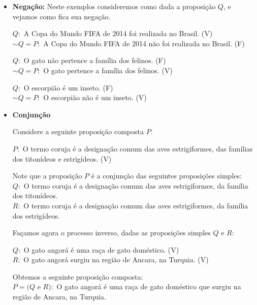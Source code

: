  \begin{itemize}
  \item \textbf{Negação:} Neste exemplos consideremos como dada a proposição $Q$, e vejamos como fica sua negação.

  \begin{exem} \label{(Neg. 1)}
    $Q:$ A Copa do Mundo FIFA de 2014 foi realizada no Brasil. (V) \\
    $\sim Q= P:$ A Copa do Mundo FIFA de 2014 não foi realizada no Brasil. (F)
  \end{exem}

 \begin{exem} \label{(Neg. 2)}
   $Q:$ O gato não pertence a família dos felinos. (F)\\
   $\sim Q= P:$ O gato pertence a família dos felinos. (V)
 \end{exem}

 \begin{exem} \label{(Neg. 3)}
   $Q:$ O escorpião é um inseto. (F)\\
   $\sim Q= P:$ O escorpião não é um inseto. (V)
 \end{exem}


 \item \textbf{Conjunção}


  \begin{exem} \label{(E 1)}
 Considere a seguinte proposição composta $P$.

 $P:$ O termo coruja é a designação comum das aves estrigiformes, das famílias dos titonídeos e estrigídeos. (V)

 Note que a proposição $P$ é a conjunção das seguintes proposições simples:\\
 $Q:$ O termo coruja é a designação comum das aves estrigiformes, da família dos titonídeos. \\
 $R:$ O termo coruja é a designação comum das aves estrigiformes, da família dos estrigídeos.
 \end{exem}

 \begin{exem} \label{(E 2)}
 Façamos agora o processo inverso, dadas as proposições simples $Q$ e $R$:

 $Q:$ O gato angorá é uma raça de gato doméstico. (V)\\
 $R:$ O gato angorá surgiu na região de Ancara, na Turquia. (V)

 Obtemos a seguinte proposição composta:\\
 $P= (Q$ e $R):$ O gato angorá é uma raça de gato doméstico que surgiu na região de Ancara, na Turquia.


\end{exem}
\end{itemize}
